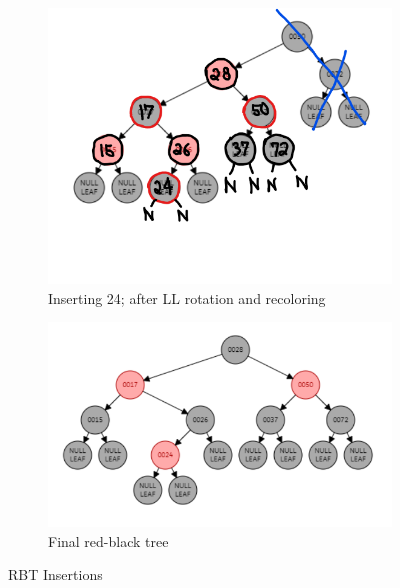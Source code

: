 \documentclass[12pt, a4paper]{article}
\begin{document}
\begin{enumerate}
\begin{figure}[h!]
\begin{subfigure}[b]{0.3\textwidth}
      \end{subfigure}
      \hfill
      \begin{subfigure}[b]{0.3\textwidth}
        \centering
        \includegraphics[width=\textwidth]{3-4-b}
        \caption{Inserting 24; after LL rotation and recoloring}
        \label{fig:3-4-b}
      \end{subfigure}
      \hfill
      \begin{subfigure}[b]{0.3\textwidth}
        \centering
        \includegraphics[width=\textwidth]{3-4-c}
        \caption{Final red-black tree}
        \label{fig:3-4-c}
      \end{subfigure}
      \caption{RBT Insertions}
      \label{fig:3}
    \end{figure}

\end{enumerate}
\end{document}
